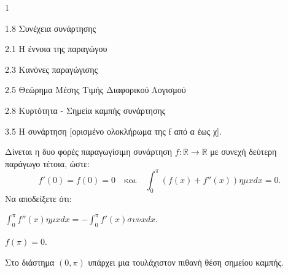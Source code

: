 \begin{ylh}{1}
    \item 1.8 Συνέχεια συνάρτησης
    \item 2.1 Η έννοια της παραγώγου
    \item 2.3 Κανόνες παραγώγισης
    \item 2.5 Θεώρημα Μέσης Τιμής Διαφορικού Λογισμού
    \item 2.8 Κυρτότητα - Σημεία καμπής συνάρτησης
    \item 3.5 Η συνάρτηση [ορισμένο ολοκλήρωμα της f από α έως χ].
\end{ylh}
Δίνεται η δυο φορές παραγωγίσιμη συνάρτηση $f: \mathbb{R} \to \mathbb{R}$ με συνεχή δεύτερη παράγωγο τέτοια, ώστε:
\[ f'(0)=f(0)=0 \quad \text{και} \quad \int_{0}^{\pi}(f(x)+f''(x))\eta\mu xdx = 0. \]
Να αποδείξετε ότι:
\begin{alist}
\item $\displaystyle \int_{0}^{\pi}f''(x)\eta\mu xdx = -\int_{0}^{\pi}f'(x)\sigma\upsilon\nu xdx$. 
\item $f(\pi)=0$. 
\item Στο διάστημα $(0,\pi)$ υπάρχει μια τουλάχιστον πιθανή θέση σημείου καμπής. 
\end{alist}